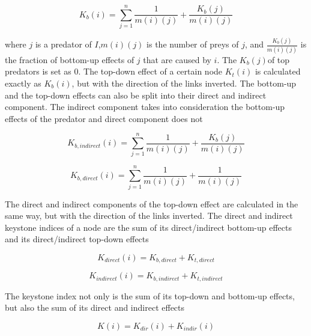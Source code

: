 						\begin{equation}
							K_b\left(i\right)=\sum_{j=1}^{n}\frac{1}{m\left(i\right)\left(j\right)}+\frac{K_b\left(j\right)}{m\left(i\right)\left(j\right)}
						\end{equation}

		\noindent where $j$ is a predator of $I$,$m(i)(j)$ is the number of preys of $j$, and $\frac{K_b\left(j\right)}{m\left(i\right)\left(j\right)}$ is the fraction of bottom-up effects of $j$ that are caused by $i$. The $K_b\left(j\right)$of top predators is set as 0. The top-down effect of a certain node $K_t\left(i\right)$ is calculated exactly as $K_b\left(i\right)$, but with the direction of the links inverted. The bottom-up and the top-down effects can also be split into their direct and indirect component. The indirect component takes into consideration the bottom-up effects of the predator and direct component does not

					\begin{equation}
						K_{b,indirect}\left(i\right)=\sum_{j=1}^{n}\frac{1}{m\left(i\right)\left(j\right)}+\frac{K_b\left(j\right)}{m\left(i\right)\left(j\right)}
					\end{equation}

					\begin{equation}
						K_{b,direct}\left(i\right)=\sum_{j=1}^{n}\frac{1}{m\left(i\right)\left(j\right)}+\frac{1}{m\left(i\right)\left(j\right)}
					\end{equation}

		The direct and indirect components of the top-down effect are calculated in the same way, but with the direction of the links inverted. The direct and indirect keystone indices of a node are the sum of its direct/indirect bottom-up effects and its direct/indirect top-down effects

					\begin{equation}
						K_{direct}(i)=K_{b,direct}+K_{t,direct}
					\end{equation}

					\begin{equation}
						K_{indirect}(i)=K_{b,indirect}+K_{t,indirect}
					\end{equation}

		The keystone index not only is the sum of its top-down and bottom-up effects, but also the sum of its direct and indirect effects

					\begin{equation}
						K\left(i\right)=K_{dir}\left(i\right)+K_{indir}\left(i\right)
					\end{equation}


